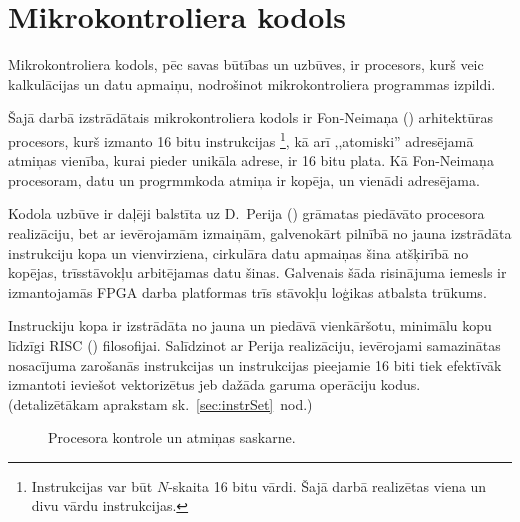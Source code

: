 \section{Mikrokontroliera kodols} \label{sec:cpu}
	Mikrokontroliera kodols, pēc savas būtības un uzbūves, ir procesors,
	kurš veic kalkulācijas un datu apmaiņu, nodrošinot mikrokontroliera
	programmas izpildi.
	
	Šajā darbā izstrādātais mikrokontroliera kodols ir 
	Fon-Neimaņa () arhitektūras pro\-ce\-sors, kurš
	izmanto 16 bitu instrukcijas%
		\footnote{Instrukcijas var būt $N$-skaita 16 bitu vārdi. 
		Šajā darbā realizētas viena un divu vārdu instrukcijas.},
	kā arī ,,atomiski'' adresējamā atmiņas vienība, kurai pieder unikāla
	adrese, ir 16 bitu plata. Kā Fon-Neimaņa procesoram, datu un
	progrmmkoda atmiņa ir kopēja, un vienādi adresējama.
	
	Kodola uzbūve ir daļēji balstīta uz D.~Perija () grāmatas%
	 piedāvāto procesora reali\-zā\-ciju, 
	bet ar ievērojamām izmaiņām, galvenokārt pilnībā no jauna izstrādāta 
	instrukciju kopa un vienvirziena,
	cirkulāra datu apmaiņas šina atšķirībā no kopējas,
	trīsstāvokļu arbitējamas datu šinas. Galvenais šāda risinājuma iemesls
	ir izmantojamās  FPGA darba platformas trīs stāvokļu
	loģikas atbalsta \mbox{trūkums.\cite[18.~lpp.]{FusionFAQ}}
	
	Instruckiju kopa ir izstrādāta no jauna un piedāvā vienkāršotu,
	mini\-mālu kopu līdzīgi RISC ()
	filo\-so\-fijai. Salīdzinot ar Perija realizāciju, ievērojami samazinātas
	nosacījuma zarošanās instrukcijas un instrukcijas pieejamie 16 biti
	tiek efektīvāk izmantoti ieviešot vektorizētus jeb dažāda garuma
	operāciju kodus. (detalizētākam aprakstam sk.~\ref{sec:instrSet}~nod.)
	\todo
	
	
	\begin{figure}[bhp]
		\centering
		\def\svgwidth{\textwidth}
		{\ttfamily\scriptsize}
		\caption{Procesora kontrole un atmiņas saskarne.}
		\label{fig:controlPipeline}
	\end{figure}
	
